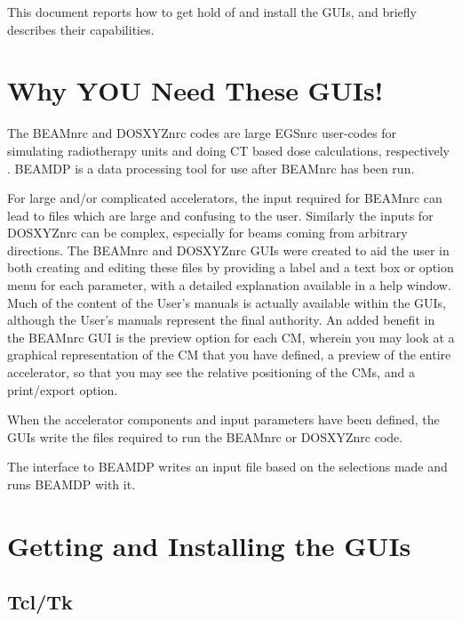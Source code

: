 \documentclass[12pt,twoside]{article}
\begin{document}
This document reports how to get hold of and install the GUIs, and
briefly describes their capabilities.


\tableofcontents

\setlength{\baselineskip}{0.5cm}

\newpage


\section{Why YOU Need These GUIs!}

The BEAMnrc and DOSXYZnrc codes are large EGSnrc user-codes for simulating
radiotherapy units and doing CT based dose calculations, respectively
\cite{Ro95,WR04a,Ro04a}.  BEAMDP is a data processing tool for
use after BEAMnrc has been run\cite{MR04a,MR04b}.

For large and/or complicated accelerators, the input required for BEAMnrc can lead
to files which are large and confusing to the user.  Similarly the
inputs for DOSXYZnrc can be complex, especially for beams coming from
arbitrary directions.  The BEAMnrc and DOSXYZnrc GUIs were
created to aid the user in both creating and editing these files by
providing a label and a text box or option menu for each parameter, with
a detailed explanation available in a help window.  Much of the content
of the User's manuals \cite{WR04a,Ro04a} is actually available within
the GUIs, although the User's manuals represent the final authority.
An added benefit in the BEAMnrc GUI is
the preview option for each CM, wherein you may look at a graphical
representation of the CM that you have defined, a preview of the entire
accelerator, so that you may see the relative positioning of the CMs,
and a print/export option.

When the accelerator components and input parameters have been defined,
the GUIs write the files required to run the BEAMnrc or DOSXYZnrc code.

The interface to BEAMDP writes an input file based on the selections made and
runs BEAMDP with it.

\section{Getting and Installing the GUIs}

\subsection{Tcl/Tk}
\end{document}
